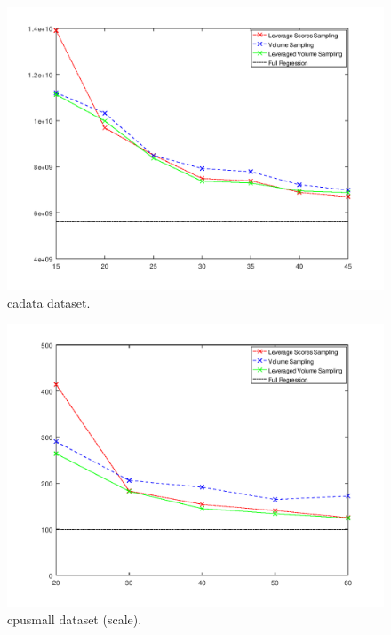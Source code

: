 \documentclass{article}
\begin{document}
        \begin{figure}[h]
            \includegraphics[width=\linewidth]{results/cadata.png}
            \caption{cadata dataset.}
            \label{fig:dataset1}
        \end{figure}
        \begin{figure}
            \includegraphics[width=\linewidth]{results/cpusmall_scale.png}
            \caption{cpusmall dataset (scale).}
            \label{fig:dataset1}
        \end{figure}
\end{document}
